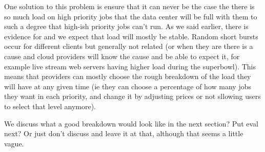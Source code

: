 One solution to this problem is ensure that it can never be the case the there
is so much load on high priority jobs that the data center will be full with
them to such a degree that high-ish priority jobs can't run. As we said earlier,
there is evidence for and we expect that load will mostly be stable. Random
short bursts occur for different clients but generally not related (or when they
are there is a cause and cloud providers will know the cause and be able to
expect it, for example live stream web servers having higher load during the
superbowl). This means that providers can mostly choose the rough breakdown of
the load they will have at any given time (ie they can choose a percentage of
how many jobs they want in each priority, and change it by adjusting prices or
not sllowing users to select that level anymore). 

We discuss what a good breakdown would look like in the next section? Put eval
next? Or just don't discuss and leave it at that, although that seems a little
vague.


